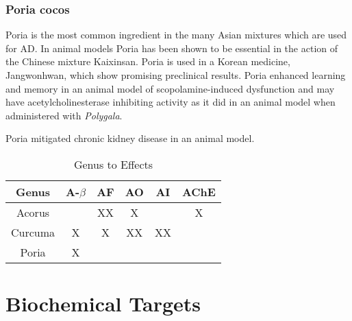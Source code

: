 \documentclass[twocolumn]{article}
\begin{document}
\subsubsection{Poria cocos}

Poria is the most common ingredient in the
many Asian mixtures which are used for AD.
In animal models Poria has been shown to be essential
in the action of the Chinese mixture Kaixinsan.
\cite{gao2010comparision}
Poria is used in a Korean medicine, Jangwonhwan,
which show promising preclinical results.
\cite{seo2010modified}
Poria enhanced learning and memory in an animal
model of scopolamine-induced dysfunction
\cite{zhang2012effects}
and may have acetylcholinesterase inhibiting activity
as it did in an animal model when administered with
\textit{Polygala}.
\cite{li2011experimental}


Poria mitigated chronic kidney disease in an animal model.
\cite{zhao2013urinary}







\begin{table*}[htp]
\centering

\begin{tabular}{||c c c c c c||}
 \hline
 Genus          & A-$\beta$ & AF & AO & AI & AChE \\
 \hline\hline
 Acorus         &           & XX &  X &    &   X  \\
 Curcuma        &     X     & X  & XX & XX &      \\
 Poria          &     X     &    &    &    &      \\
 \hline
\end{tabular}
\caption{Genus to Effects}
\label{table:effects}
\end{table*}



























\section{Biochemical Targets}
\end{document}
